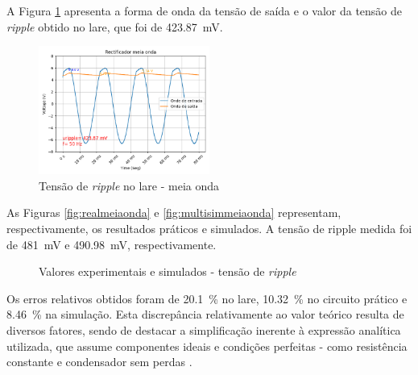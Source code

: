 A Figura \ref{fig:ripplelaremeiaonda} apresenta a forma de onda da tensão de saída e o valor da tensão de \textit{ripple} obtido no \acrshort{lare}, que foi de \SI{423,87}{\milli\volt}.

\begin{figure}[hbtp]
	\centering
	\includegraphics[width=0.5\textwidth]{figures/ripple_lare_MO-2k2-100uF.png}
	\caption{Tensão de \textit{ripple} no \acrshort{lare} - meia onda}
	\label{fig:ripplelaremeiaonda}
\end{figure}

As Figuras \ref{fig:realmeiaonda} e \ref{fig:multisimmeiaonda} representam, respectivamente, os resultados práticos e simulados. A tensão de ripple medida foi de \SI{481}{\milli\volt} e \SI{490,98}{\milli\volt}, respectivamente.

\begin{figure}[hbtp]
	\centering%
		\centering
		\qquad
		\caption{Valores experimentais e simulados - tensão de \textit{ripple}}%
		\label{fig:simulacaoripple}%
	\end{figure}

Os erros relativos obtidos foram de \SI{20,1}{\percent} no \acrshort{lare}, \SI{10,32}{\percent} no circuito prático e \SI{8,46}{\percent} na simulação. Esta discrepância relativamente ao valor teórico resulta de diversos fatores, sendo de destacar a simplificação inerente à expressão analítica utilizada, que assume componentes ideais e condições perfeitas - como resistência constante e condensador sem perdas \cite{sedrasmith}.

